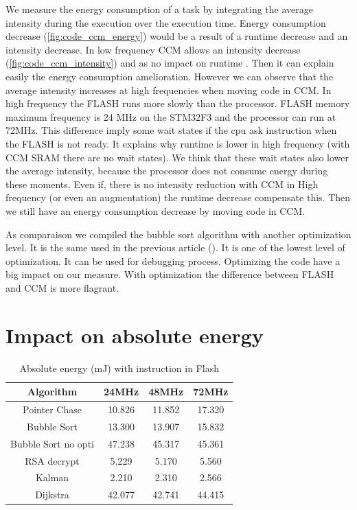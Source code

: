 \documentclass[conference]{IEEEtran}
\begin{document}
\clearpage
We measure the energy consumption of a task by integrating the average intensity
during the execution over the execution time. Energy consumption decrease
(\ref{fig:code_ccm_energy}) would be a result of a runtime decrease and an
intensity decrease. In low frequency CCM allows an intensity decrease
(\ref{fig:code_ccm_intensity}) and as no impact on runtime \cite{mem_alloc}.
Then it can explain easily the energy consumption amelioration. However we can
observe that the average intensity increases at high frequencies when moving
code in CCM. In high frequency the FLASH runs more slowly than the processor.
FLASH memory  maximum frequency is 24 MHz on the STM32F3 and the processor can
run at 72MHz. This difference imply some wait states if the cpu ask instruction
when the FLASH is not ready. It explains why runtime is lower in high frequency
(with CCM SRAM there are no wait states). We think that these wait states also
lower the average intensity, because the processor does not consume energy
during these moments. Even if, there is no intensity reduction with CCM in High
frequency (or even an augmentation) the runtime decrease compensate this. Then
we still have an energy consumption decrease by moving code in CCM.

As comparaison we compiled the bubble sort algorithm with another optimization
level. It is the same used in the previous article (\cite{mem_alloc}). It is one
of the lowest level of optimization. It can be used for debugging process.
Optimizing the code have a big impact on our measure. With optimization the
difference between FLASH and CCM is more flagrant. 

\section{Impact on absolute energy}


\begin{table}[h!]
\centering
\begin{tabular}{||c c c c||} 
 \hline
 Algorithm & 24MHz & 48MHz & 72MHz \\ [0.5ex] \hline\hline
 Pointer Chase & 10.826 & 11.852 & 17.320 \\ 
 Bubble Sort & 13.300 & 13.907 & 15.832 \\
 Bubble Sort no opti & 47.238 & 45.317 & 45.361 \\
 RSA decrypt & 5.229 & 5.170 & 5.560 \\
 Kalman & 2.210 & 2.310 & 2.566 \\
 Dijkstra & 42.077 & 42.741 & 44.415 \\[1ex] 
 \hline
\end{tabular}
\caption{Absolute energy (mJ) with instruction in Flash}
\label{energy_tab_code_flash}
\end{table}
\end{document}
